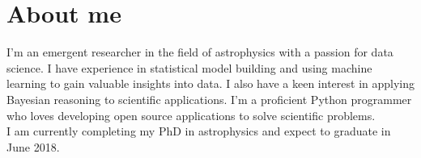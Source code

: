 \documentclass{article}
\newcommand{\uct}{\gls*{uct}\xspace}
\newcommand{\saao}{\gls*{saao}\xspace}
\begin{document}

\section{About me}


I'm an emergent researcher in the field of astrophysics with a passion for data science.  I have experience in statistical model building and using machine learning to gain valuable insights into data. I also have a keen interest in applying Bayesian reasoning to scientific applications. I'm a proficient {\sc Python} programmer who loves developing open source applications to solve scientific problems. \\

I am currently completing my PhD in astrophysics and expect to graduate in June 2018.


\end{document}
